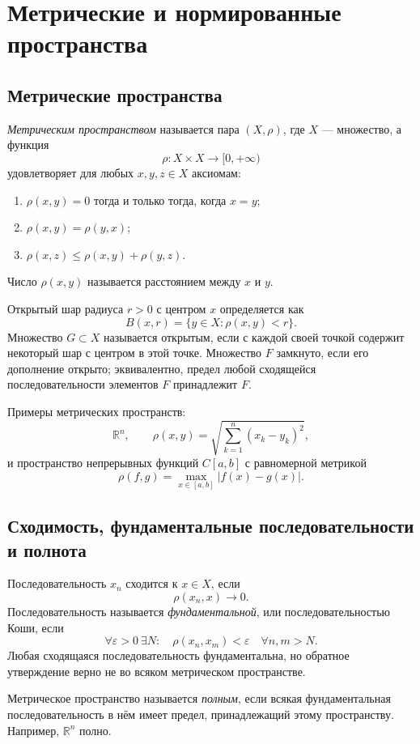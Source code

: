 \section{Метрические и нормированные пространства}
\label{sec:metric-and-normed-spaces}

\subsection{Метрические пространства}

\emph{Метрическим пространством} называется пара $(X,\rho)$, где $X$ ---
множество, а функция
\[
    \rho\colon X\times X\to[0,+\infty)
\]
удовлетворяет для любых $x,y,z\in X$ аксиомам:
\begin{enumerate}
    \item $\rho(x,y)=0$ тогда и только тогда, когда $x=y$;
    \item $\rho(x,y)=\rho(y,x)$;
    \item $\rho(x,z)\leq\rho(x,y)+\rho(y,z)$.
\end{enumerate}
Число $\rho(x,y)$ называется расстоянием между $x$ и $y$.

Открытый шар радиуса $r>0$ с центром $x$ определяется как
\[
    B(x,r)=\{y\in X:\rho(x,y)<r\}.
\]
Множество $G\subset X$ называется открытым, если с каждой своей точкой содержит
некоторый шар с центром в этой точке. Множество $F$ замкнуто, если его дополнение
открыто; эквивалентно, предел любой сходящейся последовательности элементов $F$
принадлежит $F$.

Примеры метрических пространств:
\[
    \mathbb R^n,\qquad
    \rho(x,y)=\sqrt{\sum_{k=1}^n(x_k-y_k)^2},
\]
и пространство непрерывных функций $C[a,b]$ с равномерной метрикой
\[
    \rho(f,g)=\max_{x\in[a,b]}|f(x)-g(x)|.
\]

\subsection{Сходимость, фундаментальные последовательности и полнота}

Последовательность $x_n$ сходится к $x\in X$, если
\[
    \rho(x_n,x)\to0.
\]
Последовательность называется \emph{фундаментальной}, или последовательностью
Коши, если
\[
    \forall\varepsilon>0\ \exists N:\quad
    \rho(x_n,x_m)<\varepsilon
    \quad\forall n,m>N.
\]
Любая сходящаяся последовательность фундаментальна, но обратное утверждение
верно не во всяком метрическом пространстве.

Метрическое пространство называется \emph{полным}, если всякая фундаментальная
последовательность в нём имеет предел, принадлежащий этому пространству.
Например, $\mathbb R^n$ полно.

